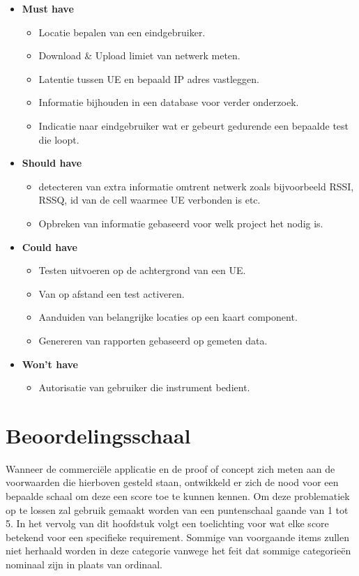 \begin{itemize}
    \item \textbf{Must have}
    \begin{itemize}
        \item Locatie bepalen van een eindgebruiker.
        \item Download \& Upload limiet van netwerk meten.
        \item Latentie tussen UE en bepaald IP adres vastleggen.
        \item Informatie bijhouden in een database voor verder onderzoek.
        \item Indicatie naar eindgebruiker wat er gebeurt gedurende een bepaalde test die loopt.
    \end{itemize}
    \item \textbf{Should have}
    \begin{itemize}
        \item detecteren van extra informatie omtrent netwerk zoals bijvoorbeeld RSSI, RSSQ, id van de cell waarmee UE verbonden is etc.
        \item Opbreken van informatie gebaseerd voor welk project het nodig is.
    \end{itemize}
    \item \textbf{Could have}
    \begin{itemize}
        \item Testen uitvoeren op de achtergrond van een UE.
        \item Van op afstand een test activeren.
        \item Aanduiden van belangrijke locaties op een kaart component.
        \item Genereren van rapporten gebaseerd op gemeten data.
    \end{itemize}
    \item \textbf{Won't have}
    \begin{itemize}
        \item Autorisatie van gebruiker die instrument bedient.
    \end{itemize}
\end{itemize}

\section{Beoordelingsschaal}

Wanneer de commerciële applicatie en de proof of concept zich meten aan de voorwaarden die hierboven gesteld staan, ontwikkeld er zich de nood voor een bepaalde schaal om deze een score toe te kunnen kennen. Om deze problematiek op te lossen zal gebruik gemaakt worden van een puntenschaal gaande van 1 tot 5. In het vervolg van dit hoofdstuk volgt een toelichting voor wat elke score betekend voor een specifieke requirement. Sommige van voorgaande items zullen niet herhaald worden in deze categorie vanwege het feit dat sommige categorieën nominaal zijn in plaats van ordinaal.

